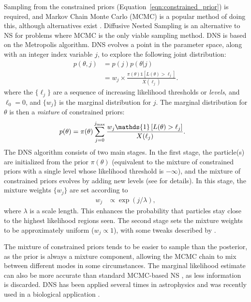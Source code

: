 \documentclass[article]{jss}
\begin{document}
Sampling from the constrained priors (Equation~\ref{eqn:constrained_prior})
is required, and Markov Chain Monte Carlo (MCMC) is a popular method of doing
this, although alternatives exist \citep[e.g.][]{multinest, 2015MNRAS.453.4384H}.
Diffusive Nested Sampling \citep[DNS][]{dnest} is an alternative to NS for
problems where MCMC is the only viable sampling method. DNS is based on the
Metropolis algorithm. DNS evolves a point in the parameter space, along with
an integer index variable $j$,
to explore the following joint distribution:
\begin{align}
p(\theta, j) &= p(j)p(\theta | j)\\
&= w_j \times
\frac{\pi(\theta)\mathds{1}\left[L(\theta) > \ell_j\right]}{X(\ell_j)}.
\label{eqn:target_distribution}
\end{align}
where the $\{\ell_j\}$ are a sequence of increasing likelihood thresholds
or {\em levels}, and
$\ell_0 = 0$, and $\{w_j\}$ is the marginal distribution for $j$.
The marginal distribution for $\theta$ is then a {\em mixture} of
constrained priors:
\begin{align}
p(\theta) &=
\pi(\theta)\sum_{j=0}^{j_{\rm max}}
\frac{w_j\mathds{1}\left[L(\theta) > \ell_j\right]}{X(\ell_j)}.
\label{eqn:mixture_of_constrained_priors}
\end{align}
The DNS algorithm consists of two main stages. In the first stage,
the particle(s) are initialized from the prior $\pi(\theta)$ (equivalent
to the mixture of constrained priors with a single level whose likelihood
threshold is $-\infty$), and
the mixture of constrained priors evolves by adding new levels
(see \citet{dnest} for details). In this stage,
the mixture weights $\{w_j\}$ are set according to
\begin{align}
w_j &\propto \exp(j/\lambda),\label{eqn:weighting}
\end{align}
where $\lambda$ is a scale length.
This enhances the probability that particles stay close to the
highest likelihood regions seen.
The second stage sets the mixture weights to be approximately
uniform ($w_j \propto 1$), with some tweaks described by \citet{dnest}.

The mixture of constrained priors tends to be easier to sample than the
posterior, as the prior is always a mixture component, allowing the
MCMC chain to mix between different modes in some circumstances. The marginal
likelihood estimate can also be more accurate than standard MCMC-based NS
\citep{dnest}, as less information is discarded.
DNS has been applied several times in astrophysics
\citep[e.g.][]{2014MNRAS.445.3055P, 2015ApJ...810...66H, 2015MNRAS.448.3206B}
and was recently used in a biological application \citep{salmonella}.
\end{document}
